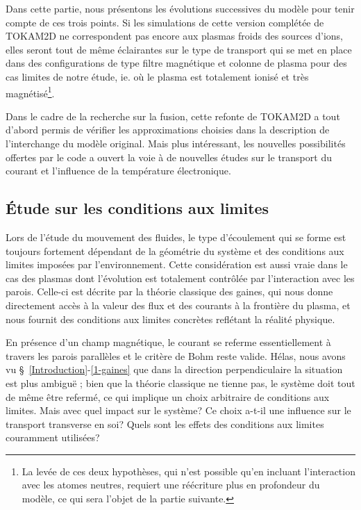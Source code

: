 \begin{refsection}
Dans cette partie, nous présentons les évolutions successives du modèle pour
tenir compte de ces trois points.
Si les simulations de cette version complétée de TOKAM2D ne correspondent pas
encore aux plasmas froids des sources d'ions, elles seront tout de même
éclairantes sur le type de
transport qui se met en place dans des configurations de type filtre magnétique
et colonne de plasma pour des cas limites de notre étude, ie. où le plasma
est totalement ionisé et très magnétisé\footnote{La levée de ces deux hypothèses, qui n'est possible qu'en incluant l'interaction avec les atomes neutres, requiert une réécriture
plus en profondeur du modèle, ce qui sera l'objet de la partie suivante.}.

Dans le cadre de la recherche sur la fusion, cette refonte de TOKAM2D a tout
d'abord permis de vérifier les approximations choisies dans la description de
l'interchange du modèle original. Mais plus intéressant, les nouvelles
possibilités offertes par le code a ouvert la voie à de nouvelles études sur le transport du courant
et l'influence de la température électronique.

\subsection{Étude sur les conditions aux limites}
	
	Lors de l'étude du mouvement des fluides, le type d'écoulement qui se
	forme est toujours fortement dépendant de la géométrie du système et des conditions aux limites
	imposées par l'environnement. Cette considération est aussi vraie dans le
	cas des plasmas dont l'évolution est totalement contrôlée par l'interaction
	avec les parois. Celle-ci est décrite par la théorie classique des gaines,
	qui nous donne directement accès à la valeur des flux et des courants à la
	frontière du plasma, et nous fournit des conditions aux limites concrètes
	reflétant la réalité physique.
	
	En présence d'un champ magnétique, le courant se referme essentiellement
	à travers les parois parallèles et le critère de Bohm reste valide.
	Hélas, nous avons vu \S~\ref{Introduction}-\ref{1-gaines} que dans la direction
	perpendiculaire la situation est plus ambiguë ; bien que la théorie
	classique ne tienne pas, le système doit tout de même être refermé, ce qui
	implique un choix arbitraire de conditions aux limites. Mais avec quel impact sur le
	système? Ce choix a-t-il une influence sur le transport transverse en soi?
	Quels sont les effets des conditions aux limites couramment utilisées?
	

\end{refsection}
